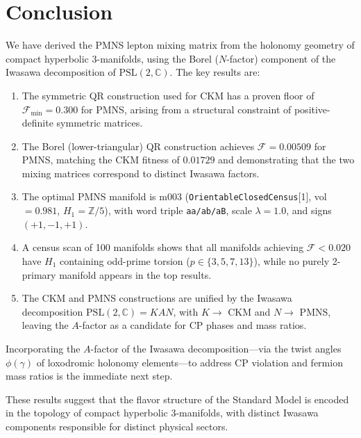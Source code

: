 \documentclass[11pt,a4paper]{article}
\newcommand{\PSL}{\mathrm{PSL}(2,\mathbb{C})}
\begin{document}
\section{Conclusion}
\label{sec:conclusion}

We have derived the PMNS lepton mixing matrix from the holonomy
geometry of compact hyperbolic 3-manifolds, using the Borel
($N$-factor) component of the Iwasawa decomposition of $\PSL$.
The key results are:

\begin{enumerate}
\item The symmetric QR construction used for CKM has a proven
floor of $\mathcal{F}_{\min} = 0.300$ for PMNS, arising from a
structural constraint of positive-definite symmetric matrices.

\item The Borel (lower-triangular) QR construction achieves
$\mathcal{F} = 0.00509$ for PMNS, matching the CKM fitness of
$0.01729$ and demonstrating that the two mixing matrices
correspond to distinct Iwasawa factors.

\item The optimal PMNS manifold is m003
(\texttt{OrientableClosedCensus}[1], vol $= 0.981$,
$H_1 = \mathbb{Z}/5$), with word triple \texttt{aa/ab/aB},
scale $\lambda = 1.0$, and signs $(+1, -1, +1)$.

\item A census scan of 100 manifolds shows that all manifolds
achieving $\mathcal{F} < 0.020$ have $H_1$ containing odd-prime
torsion ($p \in \{3, 5, 7, 13\}$), while no purely 2-primary manifold
appears in the top results.

\item The CKM and PMNS constructions are unified by the Iwasawa
decomposition $\PSL = KAN$, with $K \to$ CKM and $N \to$ PMNS,
leaving the $A$-factor as a candidate for CP phases and mass ratios.
\end{enumerate}

Incorporating the $A$-factor of the Iwasawa decomposition---via
the twist angles $\phi(\gamma)$ of loxodromic holonomy elements---to
address CP violation and fermion mass ratios is the immediate next step.

These results suggest that the flavor structure of the Standard Model
is encoded in the topology of compact hyperbolic 3-manifolds, with distinct Iwasawa components responsible for distinct physical sectors.
\end{document}
